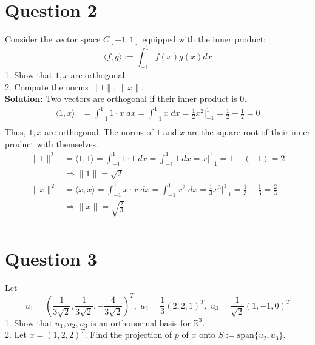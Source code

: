 \documentclass{article}
\begin{document}
\newpage
\section*{Question 2}
Consider the vector space $C[-1, 1]$ equipped with the inner product:
$$ \langle f, g \rangle := \int_{-1}^1 f(x)g(x) dx $$
1. Show that $1, x$ are orthogonal.\\
2. Compute the norms $\|1\|$, $\|x\|$.\\

\vspace{0.5cm}
\noindent\textbf{Solution:} Two vectors are orthogonal if their inner product is 0.
\begin{align*}
    \langle 1, x \rangle &= \int_{-1}^1 1 \cdot x \; dx = \int_{-1}^1 x \; dx = \frac{1}{2}x^2 \Big|_{-1}^1 = \frac{1}{2} - \frac{1}{2} = 0 \\
\end{align*}
Thus, $1, x$ are orthogonal.
The norms of $1$ and $x$ are the square root of their inner product with themselves.
\begin{align*}
    \|1\|^2 &= \langle 1, 1 \rangle = \int_{-1}^1 1 \cdot 1 \; dx = \int_{-1}^1 1 \; dx = x \Big|_{-1}^1 = 1 - (-1) = 2 \\
    &\Longrightarrow \|1\| = \sqrt{2} \\
    \|x\|^2 &= \langle x, x \rangle = \int_{-1}^1 x \cdot x \; dx = \int_{-1}^1 x^2 \; dx = \frac{1}{3}x^3 \Big|_{-1}^1 = \frac{1}{3} - \frac{1}{3} = \frac{2}{3} \\
    &\Longrightarrow \|x\| = \sqrt{\frac{2}{3}} \\
\end{align*}

\newpage
\section*{Question 3}
Let $$ u_1 = \left( \frac{1}{3\sqrt{2}}, \frac{1}{3\sqrt{2}}, -\frac{4}{3\sqrt{2}}\right)^T, \; u_2 = \frac{1}{3}(2, 2, 1)^T, \; u_3 = \frac{1}{\sqrt{2}}(1, -1, 0)^T $$
1. Show that $u_1, u_2, u_3$ is an orthonormal basis for $\mathbb{R}^3$.\\
2. Let $x=(1, 2, 2)^T$. Find the projection of $p$ of $x$ onto $S := \text{span}\{u_2, u_3\}$.
\end{document}
